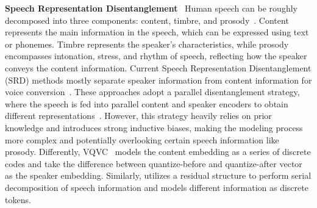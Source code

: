 \noindent\textbf{Speech Representation Disentanglement}~
Human speech can be roughly decomposed into three components: content, timbre, and prosody~\citep{liu2023unifyspeech}. Content represents the main information in the speech, which can be expressed using text or phonemes. Timbre represents the speaker's characteristics, while prosody encompasses intonation, stress, and rhythm of speech, reflecting how the speaker conveys the content information.
Current Speech Representation Disentanglement (SRD) methods mostly separate speaker information from content information for voice conversion~\citep{qian2019autovc,pmlr-v162-casanova22a}. These approaches adopt a parallel disentanglement strategy, where the speech is fed into parallel content and speaker encoders to obtain different representations~\citep{qian2020unsupervised}. However, this strategy heavily relies on prior knowledge and introduces strong inductive biases, making the modeling process more complex and potentially overlooking certain speech information like prosody. 
Differently, VQVC~\citep{wu2020one} models the content embedding as a series of discrete codes and take the difference between
quantize-before and quantize-after vector as the speaker embedding.
Similarly, \method utilizes a residual structure to perform serial decomposition of speech information and models different information as discrete tokens.


